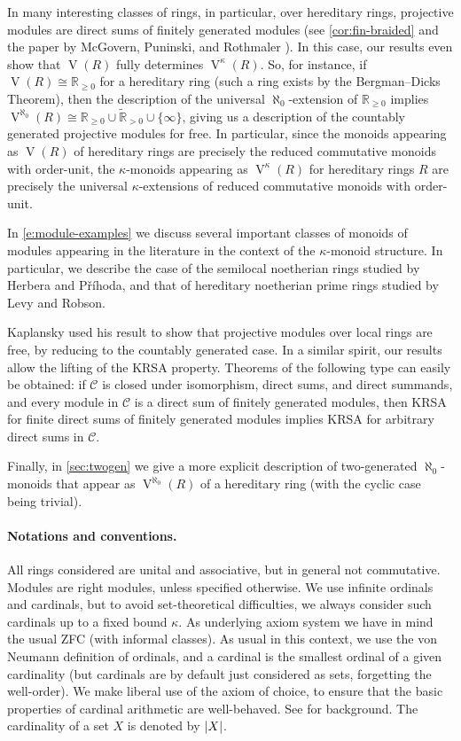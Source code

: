 \documentclass[a4paper,11pt,oneside]{amsart}
\theoremstyle{remark}
\DeclarePairedDelimiter{\card}{\lvert}{\rvert}
\newcommand{\bR}{\mathbb R}
\newcommand{\cC}{\mathcal C}
\DeclareMathOperator{\Vmon}{V}
\begin{document}
In many interesting classes of rings, in particular, over hereditary rings, projective modules are direct sums of finitely generated modules (see \cref{cor:fin-braided} and the paper by McGovern, Puninski, and Rothmaler \cite{McGovernPuninskiRothmaler07}).
In this case, our results even show that $\Vmon(R)$ fully determines $\Vmon^{\kappa}(R)$.
So, for instance, if $\Vmon(R) \cong \bR_{\ge 0}$ for a hereditary ring (such a ring exists by the Bergman--Dicks Theorem), then the description of the universal $\aleph_0$-extension of $\bR_{\ge 0}$ implies $\Vmon^{\aleph_0}(R) \cong \bR_{\ge 0} \cup \widetilde{\bR}_{>0} \cup \{\infty\}$, giving us a description of the countably generated projective modules for free.
In particular, since the monoids appearing as $\Vmon(R)$ of hereditary rings are precisely the reduced commutative monoids with order-unit, the $\kappa$-monoids appearing as $\Vmon^{\kappa}(R)$ for hereditary rings $R$ are precisely the universal $\kappa$-extensions of reduced commutative monoids with order-unit.
  
In \cref{e:module-examples} we discuss several important classes of monoids of modules appearing in the literature in the context of the $\kappa$-monoid structure.
In particular, we describe the case of the semilocal noetherian rings studied by Herbera and Příhoda, and that of hereditary noetherian prime rings studied by Levy and Robson.

Kaplansky used his result to show that projective modules over local rings are free, by reducing to the countably generated case.
In a similar spirit, our results allow the lifting of the KRSA property.
Theorems of the following type can easily be obtained: if $\cC$ is closed under isomorphism, direct sums, and direct summands, and every module in $\cC$ is a direct sum of finitely generated modules, then KRSA for finite direct sums of finitely generated modules implies KRSA for arbitrary direct sums in $\cC$.

Finally, in \cref{sec:twogen} we give a more explicit description of two-generated $\aleph_0$-monoids that appear as $\Vmon^{\aleph_0}(R)$ of a hereditary ring (with the cyclic case being trivial).


\smallskip\paragraph{Notations and conventions.}
All rings considered are unital and associative, but in general not commutative.
Modules are right modules, unless specified otherwise.
We use infinite ordinals and cardinals, but to avoid set-theoretical difficulties, we always consider such cardinals up to a fixed bound $\kappa$.
As underlying axiom system we have in mind the usual ZFC (with informal classes).
As usual in this context, we use the von Neumann definition of ordinals, and a cardinal is the smallest ordinal of a given cardinality (but cardinals are by default just considered as sets, forgetting the well-order).
We make liberal use of the axiom of choice, to ensure that the basic properties of cardinal arithmetic are well-behaved.
See \cite[Chapter 5]{roitman90} for background.
The cardinality of a set $X$ is denoted by $\card{X}$.
\end{document}
